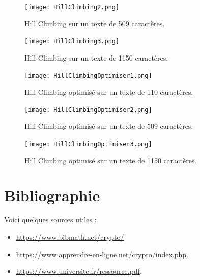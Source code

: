 \documentclass[a4paper]{article}
\begin{document}
\begin{figure}[H]
    \centering
    \texttt{[image: HillClimbing2.png]}
    \caption{Hill Climbing sur un texte de 509 caractères.}
    \label{fig:hill_509}
\end{figure}

\begin{figure}[H]
    \centering
    \texttt{[image: HillClimbing3.png]}
    \caption{Hill Climbing sur un texte de 1150 caractères.}
    \label{fig:hill_1150}
\end{figure}
\begin{figure}[H]
    \centering
    \texttt{[image: HillClimbingOptimiser1.png]}
    \caption{Hill Climbing optimisé sur un texte de 110 caractères.}
    \label{fig:hillopt_110}
\end{figure}

\begin{figure}[H]
    \centering
    \texttt{[image: HillClimbingOptimiser2.png]}
    \caption{Hill Climbing optimisé sur un texte de 509 caractères.}\label{fig:hillopt_509}
\end{figure}

\begin{figure}[H]
    \centering
    \texttt{[image: HillClimbingOptimiser3.png]}
    \caption{Hill Climbing optimisé sur un texte de 1150 caractères.}
    \label{fig:hillopt_1150}
\end{figure}

\clearpage
\section*{Bibliographie}
\label{sec:bibliographie}

Voici quelques sources utiles :
\begin{itemize}
    \item \url{https://www.bibmath.net/crypto/}
    \item \url{https://www.apprendre-en-ligne.net/crypto/index.php}.
    \item \url{https://www.universite.fr/ressource.pdf}.
\end{itemize}
\end{document}

